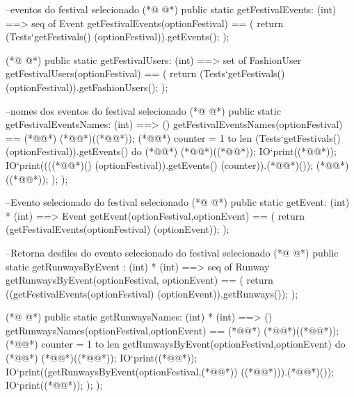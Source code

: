 \begin{vdmpp}[breaklines=true]
  --eventos do festival selecionado
(*@
\label{getFestivalEvents:69}
@*)
  public static getFestivalEvents: (int) ==> seq of Event
  getFestivalEvents(optionFestival) ==
  ( 
  return (Tests`getFestivals() (optionFestival)).getEvents();
  );
  
(*@
\label{getFestivalUsers:75}
@*)
  public static getFestivalUsers: (int) ==> set of FashionUser
  getFestivalUsers(optionFestival) ==
  ( 
  return (Tests`getFestivals() (optionFestival)).getFashionUsers();
  );
  
  
    
  --nomes dos eventos do festival selecionado
(*@
\label{getFestivalEventsNames:84}
@*)
  public static getFestivalEventsNames: (int) ==> ()
  getFestivalEventsNames(optionFestival) ==
  (*@\vdmnotcovered{(}@*) 
    (*@@*)((*@@*));
    (*@@*) counter = 1 to len (Tests`getFestivals() (optionFestival)).getEvents() do (*@\vdmnotcovered{(}@*)
    (*@@*)((*@@*));
    IO`print((*@@*));
    IO`print((((*@@*)() (optionFestival)).getEvents() (counter)).(*@@*)());
    (*@@*)((*@@*));
    );
  );

 --Evento selecionado do festival selecionado
(*@
\label{getEvent:97}
@*)
 public static getEvent: (int) * (int) ==> Event
  getEvent(optionFestival,optionEvent) ==
  ( 
  return (getFestivalEvents(optionFestival) (optionEvent));
  );
  
 --Retorna desfiles do evento selecionado do festival selecionado
(*@
\label{getRunwaysByEvent:104}
@*)
  public static getRunwaysByEvent : (int) * (int) ==> seq of Runway
 getRunwaysByEvent(optionFestival, optionEvent) ==
 (
  return ((getFestivalEvents(optionFestival) (optionEvent)).getRunways());
 );
 
(*@
\label{getRunwaysNames:110}
@*)
 public static getRunwaysNames: (int) * (int) ==> ()
  getRunwaysNames(optionFestival,optionEvent) ==
  (*@\vdmnotcovered{(}@*) 
    (*@@*)((*@@*));
    (*@@*) counter = 1 to len getRunwaysByEvent(optionFestival,optionEvent) do (*@\vdmnotcovered{(}@*)
    (*@@*)((*@@*));
    IO`print((*@@*));
    IO`print((getRunwaysByEvent(optionFestival,(*@@*)) ((*@@*))).(*@@*)());
    IO`print((*@@*));
    );
  );
  

\end{vdmpp}
